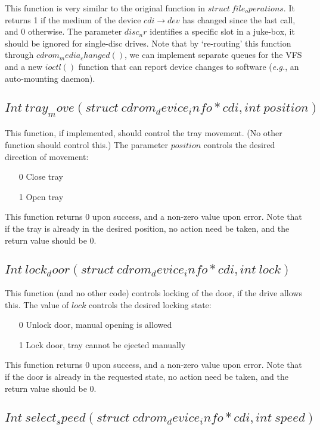 \documentclass{article}
\def\fo{\sl}                    %
\def\eg{{\fo e.g.}}
\begin{document}
This function is very similar to the original function in $struct\ 
file_operations$. It returns 1 if the medium of the device $cdi\to
dev$ has changed since the last call, and 0 otherwise. The parameter
$disc_nr$ identifies a specific slot in a juke-box, it should be
ignored for single-disc drives.  Note that by `re-routing' this
function through $cdrom_media_changed()$, we can implement separate
queues for the VFS and a new $ioctl()$ function that can report device
changes to software (\eg, an auto-mounting daemon).

\subsection{$Int\ tray_move(struct\ cdrom_device_info * cdi, int\ position)$}

This function, if implemented, should control the tray movement. (No
other function should control this.) The parameter $position$ controls
the desired direction of movement:
\begin{itemize}
\item[0] Close tray
\item[1] Open tray
\end{itemize}
This function returns 0 upon success, and a non-zero value upon
error. Note that if the tray is already in the desired position, no
action need be taken, and the return value should be 0. 

\subsection{$Int\ lock_door(struct\ cdrom_device_info * cdi, int\ lock)$}

This function (and no other code) controls locking of the door, if the
drive allows this. The value of $lock$ controls the desired locking
state:
\begin{itemize}
\item[0] Unlock door, manual opening is allowed
\item[1] Lock door, tray cannot be ejected manually
\end{itemize}
This function returns 0 upon success, and a non-zero value upon
error. Note that if the door is already in the requested state, no
action need be taken, and the return value should be 0. 

\subsection{$Int\ select_speed(struct\ cdrom_device_info * cdi, int\ speed)$}
\end{document}
